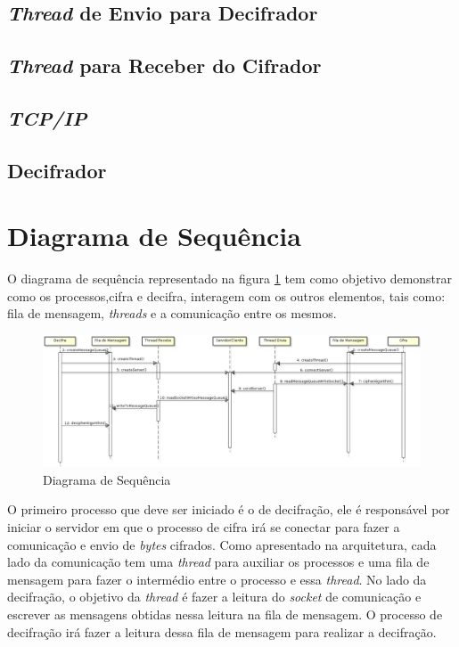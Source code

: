 \subsection{\textit{Thread} de Envio para Decifrador}

\subsection{\textit{Thread} para Receber do Cifrador}

\subsection{\textit{TCP/IP}}

\subsection{Decifrador}

\section{Diagrama de Sequência}

O diagrama de sequência representado na figura \ref{sequence-diagram} tem como objetivo demonstrar como os processos,cifra e  decifra, interagem com os outros elementos, tais como: fila de mensagem, \textit{threads} e a comunicação entre os mesmos. 

\begin{figure}[h]
	\centering
	\includegraphics[scale=0.35]{figuras/sequenceDiagram.eps}
	\caption{Diagrama de Sequência}
	\label{sequence-diagram}
\end{figure}

O primeiro processo que deve ser iniciado é o de decifração, ele é responsável por iniciar o servidor em que o processo de cifra irá se conectar para fazer a comunicação e envio de \textit{bytes} cifrados. Como apresentado na arquitetura, cada lado da comunicação tem uma \textit{thread} para auxiliar os processos e uma fila de mensagem para fazer o intermédio entre o processo e essa \textit{thread}. No lado da decifração, o objetivo da \textit{thread} é fazer a leitura do \textit{socket} de comunicação e escrever as mensagens obtidas nessa leitura na fila de mensagem. O processo de decifração irá fazer a leitura dessa fila de mensagem para realizar a decifração.

